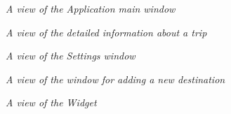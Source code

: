 


\usepackage{graphicx}   %


\begin{figure}
 
\begin{center}

  \caption{\emph{A view of the Application main window}}
  

\end{center}    
\end{figure}

\begin{figure}
 
\begin{center}

  \caption{\emph{A view of the detailed information about a trip}}
  

\end{center}    
\end{figure}


\begin{figure}
 
\begin{center}

  \caption{\emph{A view of the Settings window}}
  

\end{center}    
\end{figure}


\begin{figure}
 
\begin{center}

  \caption{\emph{A view of the window for adding a new destination}}
  

\end{center}    
\end{figure}


\begin{figure}
 
\begin{center}

  \caption{\emph{A view of the Widget}}
  

\end{center}    
\end{figure}





